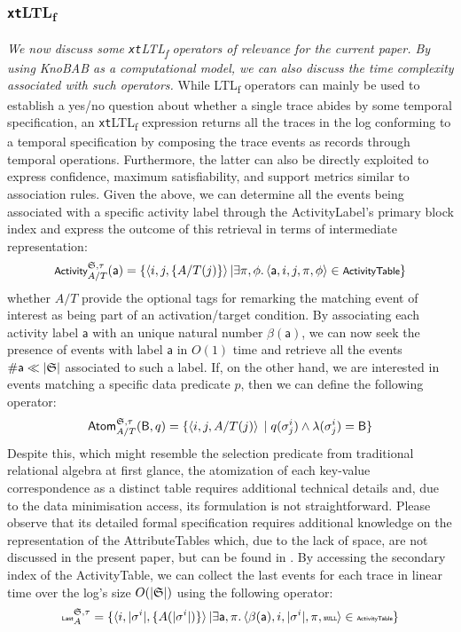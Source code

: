 \documentclass[sigconf]{acmart}
\newcommand{\const}[1]{\ensuremath{\mathsf{#1}}}
\begin{document}
\subsubsection{\texttt{xt}LTL\textsubscript{f}}
\textit{We now discuss some \texttt{xt}LTL\textsubscript{f} operators of relevance for the current paper. By using KnoBAB as a computational model, we can also discuss the time complexity associated with such operators.} While LTL\textsubscript{f} operators can mainly be used to establish a yes/no question about whether a single trace abides by some temporal specification, an \texttt{xt}LTL\textsubscript{f} expression returns all the traces in the log conforming to a temporal specification by composing the trace events as records through temporal operations. Furthermore, the latter can also be directly exploited to express confidence, maximum satisfiability, and support metrics similar to association rules. Given the above, we can determine all the events being associated with a specific activity label through the ActivityLabel's primary block index and express the outcome of this retrieval in terms of intermediate representation:
\[\footnotesize \textsf{Activity}^{\LOG,\tau}_{A/T}(\const{a})=\{\braket{i,j,\{A/T(j)\}}|\exists \pi,\phi.\braket{\const{a},i,j,\pi,\phi}\in\textsf{ActivityTable}\}\]
whether $A/T$ provide the optional tags for remarking the matching event of interest as being part of an activation/target condition. By associating each activity label \const{a} with an unique natural number $\beta(\const{a})$, we can now seek the presence of events with label \const{a} in $O(1)$ time and retrieve all the events $\#{\textsf{a}}\ll |\mathfrak{S}|$ associated to such a label. If, on the other hand, we are interested in events matching a specific data predicate $p$, then we can define the following operator:
\[\textsf{Atom}^{\mathfrak{S},\tau}_{A/T}(\textsf{B},q)=\{\braket{i,j,{A/T(j)}}\;|\;q(\sigma^i_j)\wedge \lambda(\sigma^i_j)=\textsf{B}\}\]
Despite this, which might resemble the selection predicate from traditional relational algebra at first glance, the atomization of each key-value correspondence as a distinct table requires additional technical details and, due to the data minimisation access, its formulation is not straightforward. Please observe that its detailed formal specification requires additional knowledge on the representation of the AttributeTables which, due to the lack of space, are not discussed in the present paper, but can be found in  \cite{info14030173}. By accessing the secondary index of the \textsf{ActivityTable}, we can collect the last events for each trace in linear time over the log's size $O(|\mathfrak{S}|)$ using the following operator:
\[\tiny\textsf{Last}^{\LOG,\tau}_{A}=\{\braket{i,\vert\sigma^i\vert,\{A(\vert\sigma^i\vert)\}}|\exists \const{a}, \pi.\braket{\beta(\const{a}),i,|\sigma^i|,\pi,\texttt{NULL}}\in\textsf{ActivityTable}\}\]
\end{document}
